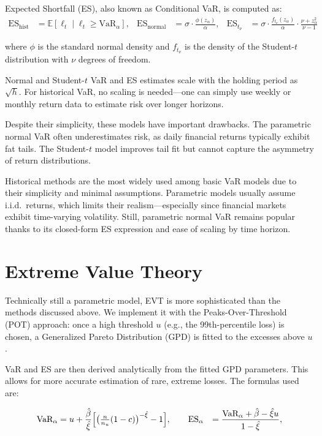 \documentclass[12pt]{article}
\begin{document}
Expected Shortfall (ES), also known as Conditional VaR, is computed as:
\[
\begin{aligned}
\mathrm{ES}_{\mathrm{hist}} &= \mathbb{E}\left[\ell_t \mid \ell_t \ge \text{VaR}_\alpha\right], &
\mathrm{ES}_{\mathrm{normal}} &= \sigma \cdot \frac{\phi(z_{\alpha})}{\alpha}, &
\mathrm{ES}_{t_\nu} &= \sigma \cdot \frac{f_{t_\nu}(z_{\alpha})}{\alpha} \cdot \frac{\nu + z_{\alpha}^2}{\nu - 1}
\end{aligned}
\]

where \( \phi \) is the standard normal density and \( f_{t_\nu} \) is the density of the Student-\( t \) distribution with \( \nu \) degrees of freedom.

Normal and Student-\( t \) VaR and ES estimates scale with the holding period as \( \sqrt{h} \). For historical VaR, no scaling is needed—one can simply use weekly or monthly return data to estimate risk over longer horizons.

Despite their simplicity, these models have important drawbacks. The parametric normal VaR often underestimates risk, as daily financial returns typically exhibit fat tails. The Student-$t$ model improves tail fit but cannot capture the asymmetry of return distributions. 

Historical methods are the most widely used among basic VaR models due to their simplicity and minimal assumptions. Parametric models usually assume i.i.d.\ returns, which limits their realism—especially since financial markets exhibit time-varying volatility. Still, parametric normal VaR remains popular thanks to its closed-form ES expression and ease of scaling by time horizon.



\section{Extreme Value Theory}

Technically still a parametric model, EVT is more sophisticated than the methods discussed above. We implement it with the Peaks-Over-Threshold (POT) approach: once a high threshold $u$ (e.g., the 99th-percentile loss) is chosen, a Generalized Pareto Distribution (GPD) is fitted to the excesses above $u$. 

VaR and ES are then derived analytically from the fitted GPD parameters. This allows for more accurate estimation of rare, extreme losses. The formulas used are:

\[
\begin{aligned}
{\text{VaR}}_\alpha &= u + \frac{\hat{\beta}}{\hat{\xi}}
\Bigl[\bigl(\tfrac{n}{n_u}(1-c)\bigr)^{-\hat{\xi}} - 1\Bigr],\qquad
{\text{ES}}_\alpha &= \frac{{\text{VaR}}_\alpha + \hat{\beta} - \hat{\xi} u}{1 - \hat{\xi}},
\end{aligned}
\]
\end{document}
